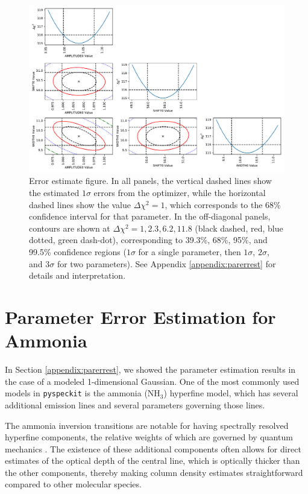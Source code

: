 \documentclass[twocolumn]{aastex63}
\newcommand{\pyspeckit}{\texttt{pyspeckit}\xspace}
\newcommand{\ammonia}{\ensuremath{\mathrm{NH}_3}\xspace}
\begin{document}
\begin{figure}[!htp]
\includegraphics[scale=1,width=7in]{error_estimate_demonstration.pdf}
\caption{Error estimate figure.
In all panels, the vertical
dashed lines show the estimated $1\sigma$ errors from the optimizer, while the
horizontal dashed lines show the value $\Delta\chi^2=1$, which corresponds to
the 68\% confidence interval for that parameter.
In the off-diagonal panels, contours are shown at $\Delta\chi^2=1,2.3,6.2,11.8$ (black dashed, red, blue dotted, green dash-dot),
corresponding to 39.3\%, 68\%, 95\%, and 99.5\% confidence
regions ($1\sigma$ for a single parameter,
then $1\sigma$, $2\sigma$, and $3\sigma$ for two parameters).
See Appendix \ref{appendix:parerrest} for details and interpretation.}
\label{fig:parerrestdemo}
\end{figure}


\section{Parameter Error Estimation for Ammonia}
\label{appendix:parerrestammonia}
In Section \ref{appendix:parerrest}, we showed the parameter estimation results
in the case of a modeled 1-dimensional Gaussian.  One of the most commonly used
models in \pyspeckit is the ammonia (\ammonia) hyperfine model, which has several
additional emission lines and several parameters governing those lines.

The ammonia inversion transitions are notable for having spectrally resolved
hyperfine components, the relative weights of which are governed by quantum
mechanics \citep{Mangum2015}. The existence of these additional components often
allows for direct estimates of the optical depth of the central line, which is
optically thicker than the other components, thereby making column density
estimates straightforward compared to other molecular species.
\end{document}
